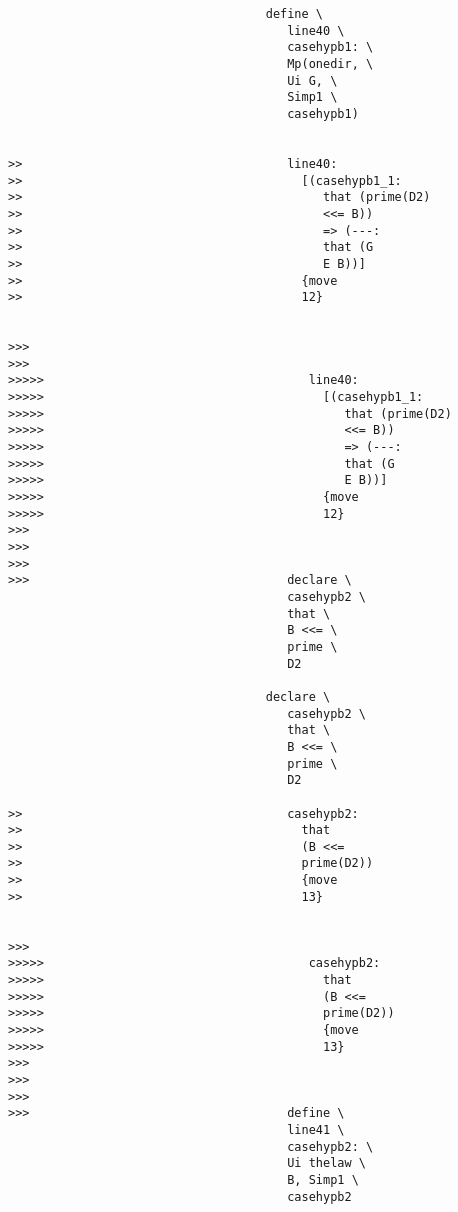 \documentclass[12pt]{article}
\begin{document}
\begin{verbatim}
                                    define \
                                       line40 \
                                       casehypb1: \
                                       Mp(onedir, \
                                       Ui G, \
                                       Simp1 \
                                       casehypb1)


>>                                     line40:
>>                                       [(casehypb1_1:
>>                                          that (prime(D2)
>>                                          <<= B))
>>                                          => (---:
>>                                          that (G
>>                                          E B))]
>>                                       {move
>>                                       12}


>>>
>>>
>>>>>                                     line40:
>>>>>                                       [(casehypb1_1:
>>>>>                                          that (prime(D2)
>>>>>                                          <<= B))
>>>>>                                          => (---:
>>>>>                                          that (G
>>>>>                                          E B))]
>>>>>                                       {move
>>>>>                                       12}
>>>
>>>
>>>
>>>                                    declare \
                                       casehypb2 \
                                       that \
                                       B <<= \
                                       prime \
                                       D2

                                    declare \
                                       casehypb2 \
                                       that \
                                       B <<= \
                                       prime \
                                       D2

>>                                     casehypb2:
>>                                       that
>>                                       (B <<=
>>                                       prime(D2))
>>                                       {move
>>                                       13}


>>>
>>>>>                                     casehypb2:
>>>>>                                       that
>>>>>                                       (B <<=
>>>>>                                       prime(D2))
>>>>>                                       {move
>>>>>                                       13}
>>>
>>>
>>>
>>>                                    define \
                                       line41 \
                                       casehypb2: \
                                       Ui thelaw \
                                       B, Simp1 \
                                       casehypb2


\end{verbatim}
\end{document}
